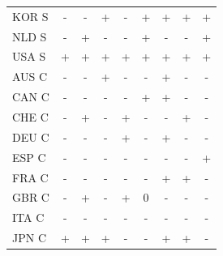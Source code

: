\documentclass[12pt,bibliography=totoc]{article}
\begin{document}
\begin{table}[H]
\begin{tabular}{l  cccccccc}
KOR S	&\cellcolor{red!25}-	&\cellcolor{red!25}-	&\cellcolor{green!25}+	&\cellcolor{red!25}-	&\cellcolor{green!25}+	&\cellcolor{green!25}+	&\cellcolor{green!25}+	&\cellcolor{green!25}+   \\
NLD S	&\cellcolor{red!25}-	&\cellcolor{green!25}+	&\cellcolor{red!25}-	&\cellcolor{red!25}-	&\cellcolor{green!25}+	&\cellcolor{red!25}-	&\cellcolor{red!25}-	&\cellcolor{green!25}+   \\
USA S	&\cellcolor{green!25}+	&\cellcolor{green!25}+	&\cellcolor{green!25}+	&\cellcolor{green!25}+	&\cellcolor{green!25}+	&\cellcolor{green!25}+	&\cellcolor{green!25}+	&\cellcolor{green!25}+   \\
AUS C	&\cellcolor{red!25}-	&\cellcolor{red!25}-	&\cellcolor{green!25}+	&\cellcolor{red!25}-	&\cellcolor{red!25}-	&\cellcolor{green!25}+	&\cellcolor{red!25}-	&\cellcolor{red!25}-     \\
CAN C	&\cellcolor{red!25}-	&\cellcolor{red!25}-	&\cellcolor{red!25}-	&\cellcolor{red!25}-	&\cellcolor{green!25}+	&\cellcolor{green!25}+	&\cellcolor{red!25}-	&\cellcolor{red!25}-     \\
CHE C	&\cellcolor{red!25}-	&\cellcolor{green!25}+	&\cellcolor{red!25}-	&\cellcolor{green!25}+	&\cellcolor{red!25}-	&\cellcolor{red!25}-	&\cellcolor{green!25}+	&\cellcolor{red!25}-     \\
DEU C	&\cellcolor{red!25}-	&\cellcolor{red!25}-	&\cellcolor{red!25}-	&\cellcolor{green!25}+	&\cellcolor{red!25}-	&\cellcolor{green!25}+	&\cellcolor{red!25}-	&\cellcolor{red!25}-     \\
ESP C	&\cellcolor{red!25}-	&\cellcolor{red!25}-	&\cellcolor{red!25}-	&\cellcolor{red!25}-	&\cellcolor{red!25}-	&\cellcolor{red!25}-	&\cellcolor{red!25}-	&\cellcolor{green!25}+   \\
FRA C	&\cellcolor{red!25}-	&\cellcolor{red!25}-	&\cellcolor{red!25}-	&\cellcolor{red!25}-	&\cellcolor{red!25}-	&\cellcolor{green!25}+	&\cellcolor{green!25}+	&\cellcolor{red!25}-     \\
GBR C	&\cellcolor{red!25}-	&\cellcolor{green!25}+	&\cellcolor{red!25}-	&\cellcolor{green!25}+	&\cellcolor{yellow!25}0	&\cellcolor{red!25}-	&\cellcolor{red!25}-	&\cellcolor{red!25}-     \\
ITA C	&\cellcolor{red!25}-	&\cellcolor{red!25}-	&\cellcolor{red!25}-	&\cellcolor{red!25}-	&\cellcolor{red!25}-	&\cellcolor{red!25}-	&\cellcolor{red!25}-	&\cellcolor{red!25}-     \\
JPN C	&\cellcolor{green!25}+	&\cellcolor{green!25}+	&\cellcolor{green!25}+	&\cellcolor{red!25}-	&\cellcolor{red!25}-	&\cellcolor{green!25}+	&\cellcolor{green!25}+	&\cellcolor{red!25}-     \\

\end{tabular}
\end{table}
\end{document}
